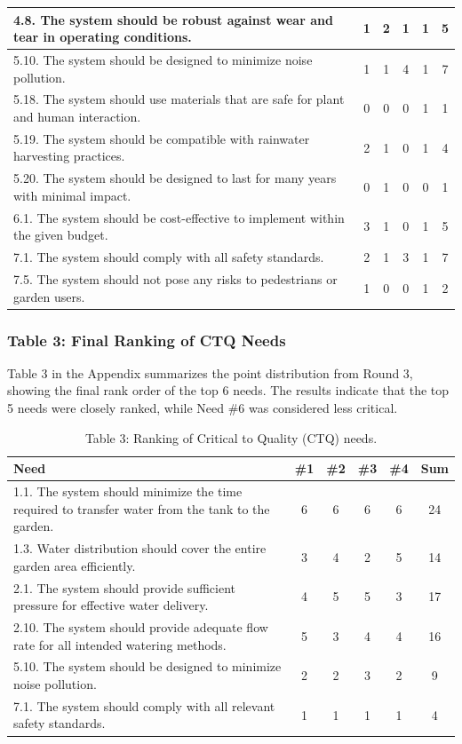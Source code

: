 \documentclass[11pt]{article}
\begin{document}
\begin{table}[H]
\begin{tabular}{|p{10cm}|c|c|c|c|c|}
4.8. The system should be robust against wear and tear in operating conditions. & 1 & 2 & 1 & 1 & 5 \\
\hline
5.10. The system should be designed to minimize noise pollution. & 1 & 1 & 4 & 1 & \cellcolor{yellow}7 \\
5.18. The system should use materials that are safe for plant and human interaction. & 0 & 0 & 0 & 1 & 1 \\
5.19. The system should be compatible with rainwater harvesting practices. & 2 & 1 & 0 & 1 & 4 \\
5.20. The system should be designed to last for many years with minimal impact. & 0 & 1 & 0 & 0 & 1 \\
\hline
6.1. The system should be cost-effective to implement within the given budget. & 3 & 1 & 0 & 1 & 5 \\
\hline
7.1. The system should comply with all safety standards. & 2 & 1 & 3 & 1 & \cellcolor{yellow}7 \\
7.5. The system should not pose any risks to pedestrians or garden users. & 1 & 0 & 0 & 1 & 2 \\
\hline
\end{tabular}
\end{table}

\subsubsection{Table 3: Final Ranking of CTQ Needs}
Table 3 in the Appendix summarizes the point distribution from Round 3, showing the final rank order of the top 6 needs. The results indicate that the top 5 needs were closely ranked, while Need \#6 was considered less critical.
\begin{table}[H]
\centering
\caption*{Table 3: Ranking of Critical to Quality (CTQ) needs.}
\begin{tabular}{|p{10cm}|c|c|c|c|c|}
\hline
\textbf{Need} & \textbf{\#1} & \textbf{\#2} & \textbf{\#3} & \textbf{\#4} & \textbf{Sum} \\
\hline
1.1. The system should minimize the time required to transfer water from the tank to the garden. & 6 & 6 & 6 & 6 & 24 \\
1.3. Water distribution should cover the entire garden area efficiently. & 3 & 4 & 2 & 5 & 14 \\
\hline
2.1. The system should provide sufficient pressure for effective water delivery. & 4 & 5 & 5 & 3 & 17 \\
2.10. The system should provide adequate flow rate for all intended watering methods. & 5 & 3 & 4 & 4 & 16 \\
\hline
5.10. The system should be designed to minimize noise pollution. & 2 & 2 & 3 & 2 & 9 \\
\hline
7.1. The system should comply with all relevant safety standards. & 1 & 1 & 1 & 1 & 4 \\
\hline
\end{tabular}
\end{table}
\end{document}
